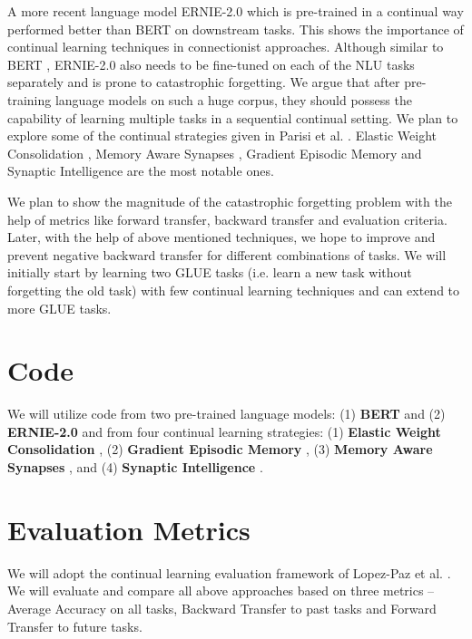 \documentclass[11pt,a4paper]{article}
\begin{document}
A more recent language model ERNIE-2.0 \cite{DBLP:journals/corr/abs-1907-12412} which is pre-trained in a continual way performed better than BERT \cite{DBLP:journals/corr/abs-1810-04805} on downstream tasks.  This shows the importance of continual learning techniques in connectionist approaches.  Although similar to BERT 
\cite{DBLP:journals/corr/abs-1810-04805}, ERNIE-2.0 \cite{DBLP:journals/corr/abs-1907-12412} also needs to be fine-tuned on each of the NLU tasks separately and is prone to catastrophic forgetting.  We argue that after pre-training language models on such a huge corpus, they should possess the capability of learning multiple tasks in a sequential continual setting.  We plan to explore some of the continual strategies given in Parisi et al. \cite{DBLP:journals/corr/abs-1802-07569}.   Elastic Weight Consolidation \cite{DBLP:journals/corr/KirkpatrickPRVD16}, Memory Aware Synapses \cite{aljundi2018memory}, Gradient Episodic Memory \cite{DBLP:journals/corr/Lopez-PazR17} and Synaptic Intelligence \cite{DBLP:journals/corr/ZenkePG17} are the most notable ones.  

We plan to show the magnitude of the catastrophic forgetting problem with the help of metrics like forward transfer, backward transfer and evaluation criteria.  Later, with the help of above mentioned techniques, we hope to improve and prevent negative backward transfer for different combinations of tasks. We will initially start by learning two GLUE tasks (i.e. learn a new task without forgetting the old task) with few continual learning techniques and can extend to more GLUE tasks.

\section{Code}
We will utilize code from two pre-trained language models: (1) \textbf{BERT} \cite{DBLP:journals/corr/abs-1810-04805} and (2) \textbf{ERNIE-2.0} \cite{DBLP:journals/corr/abs-1907-12412} and from four continual learning strategies: (1) \textbf{Elastic Weight Consolidation} \cite{EWC}, (2) \textbf{Gradient Episodic Memory} \cite{GEM}, (3) \textbf{Memory Aware Synapses} \cite{MAS}, and (4) \textbf{Synaptic Intelligence} \cite{SI}.


\section{Evaluation Metrics}
We will adopt the continual learning evaluation framework of Lopez-Paz et al. \cite{DBLP:journals/corr/Lopez-PazR17}.  We will evaluate and compare all above approaches based on three metrics -- Average Accuracy on all tasks, Backward Transfer to past tasks and Forward Transfer to future tasks.
\end{document}

